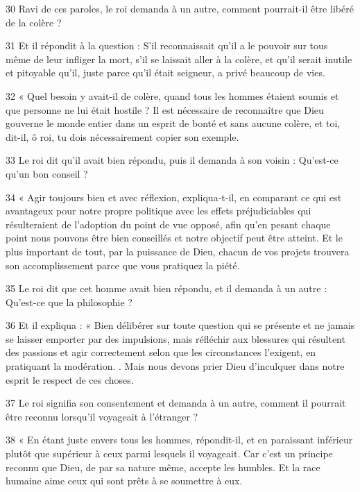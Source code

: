 \par 30 Ravi de ces paroles, le roi demanda à un autre, comment pourrait-il être libéré de la colère ?

\par 31 Et il répondit à la question : S'il reconnaissait qu'il a le pouvoir sur tous même de leur infliger la mort, s'il se laissait aller à la colère, et qu'il serait inutile et pitoyable qu'il, juste parce qu'il était seigneur, a privé beaucoup de vies.

\par 32 « Quel besoin y avait-il de colère, quand tous les hommes étaient soumis et que personne ne lui était hostile ? Il est nécessaire de reconnaître que Dieu gouverne le monde entier dans un esprit de bonté et sans aucune colère, et toi, dit-il, ô roi, tu dois nécessairement copier son exemple.

\par 33 Le roi dit qu'il avait bien répondu, puis il demanda à son voisin : Qu'est-ce qu'un bon conseil ?

\par 34 « Agir toujours bien et avec réflexion, expliqua-t-il, en comparant ce qui est avantageux pour notre propre politique avec les effets préjudiciables qui résulteraient de l'adoption du point de vue opposé, afin qu'en pesant chaque point nous pouvons être bien conseillés et notre objectif peut être atteint. Et le plus important de tout, par la puissance de Dieu, chacun de vos projets trouvera son accomplissement parce que vous pratiquez la piété.

\par 35 Le roi dit que cet homme avait bien répondu, et il demanda à un autre : Qu'est-ce que la philosophie ?

\par 36 Et il expliqua : « Bien délibérer sur toute question qui se présente et ne jamais se laisser emporter par des impulsions, mais réfléchir aux blessures qui résultent des passions et agir correctement selon que les circonstances l'exigent, en pratiquant la modération. . Mais nous devons prier Dieu d'inculquer dans notre esprit le respect de ces choses.

\par 37 Le roi signifia son consentement et demanda à un autre, comment il pourrait être reconnu lorsqu'il voyageait à l'étranger ?

\par 38 « En étant juste envers tous les hommes, répondit-il, et en paraissant inférieur plutôt que supérieur à ceux parmi lesquels il voyageait. Car c’est un principe reconnu que Dieu, de par sa nature même, accepte les humbles. Et la race humaine aime ceux qui sont prêts à se soumettre à eux.

